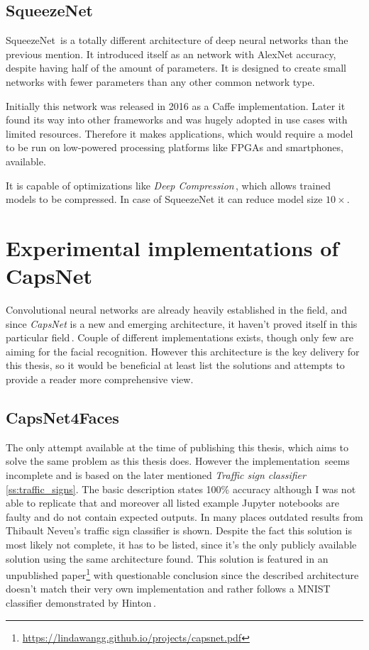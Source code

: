 \subsection{SqueezeNet}

SqueezeNet\,\cite{squeezenet} is a totally different architecture of deep neural networks than the previous mention. It introduced itself as an network with AlexNet accuracy, despite having half of the amount of parameters. It is designed to create small networks with fewer parameters than any other common network type.

Initially this network was released in 2016 as a Caffe implementation. Later it found its way into other frameworks and was hugely adopted in use cases with limited resources. Therefore it makes applications, which would require a model to be run on low-powered processing platforms like FPGAs and smartphones, available.

It is capable of optimizations like \textit{Deep Compression}\,\cite{compression}, which allows trained models to be compressed. In case of SqueezeNet it can reduce model size $10\times$.

\section{Experimental implementations of CapsNet}

Convolutional neural networks are already heavily established in the field, and since \textit{CapsNet} is a new and emerging architecture, it haven't proved itself in this particular field\,\cite{capsnet_comparative_perf}. Couple of different implementations exists, though only few are aiming for the facial recognition. However this architecture is the key delivery for this thesis, so it would be beneficial at least list the solutions and attempts to provide a reader more comprehensive view.

\subsection{CapsNet4Faces}

The only attempt available at the time of publishing this thesis, which aims to solve the same problem as this thesis does. However the implementation\,\cite{capsnet4faces} seems incomplete and is based on the later mentioned \textit{Traffic sign classifier}\,\ref{ss:traffic_signs}. The basic description states 100\% accuracy although I was not able to replicate that and moreover all listed example Jupyter notebooks are faulty and do not contain expected outputs. In many places outdated results from Thibault Neveu's traffic sign classifier is shown. Despite the fact this solution is most likely not complete, it has to be listed, since it's the only publicly available solution using the same architecture found. This solution is featured in an unpublished paper\footnote{\url{https://lindawangg.github.io/projects/capsnet.pdf}} with questionable conclusion since the described architecture doesn't match their very own implementation and rather follows a MNIST classifier demonstrated by Hinton\,\cite{capsule}.


